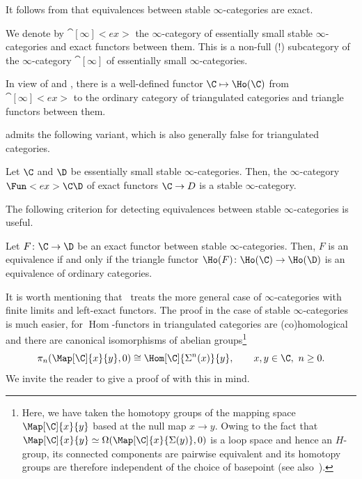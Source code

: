 \documentclass[a4paper]{amsart}
\begin{document}
\begin{remark}
  It follows from  that equivalences between stable
  $\infty$-categories are exact.
\end{remark}

\begin{definition}
  We denote by $\cat[\infty]<ex>$ the $\infty$-category of essentially small
  stable $\infty$-categories and exact functors between them. This is a non-full
  (!) subcategory of the $\infty$-category $\cat[\infty]$ of essentially small
  $\infty$-categories.
\end{definition}

\begin{remark}
  In view of  and
  , there is a well-defined functor
  $\C\mapsto\Ho(\C)$ from $\cat[\infty]<ex>$ to the ordinary category of
  triangulated categories and triangle functors between them.
\end{remark}

 admits the following variant, which is
also generally false for triangulated categories.

\begin{proposition}
  Let $\C$ and $\D$ be essentially small stable $\infty$-categories. Then, the
  $\infty$-category $\Fun<ex>{\C}{\D}$ of exact functors $\C\to D$ is a stable
  $\infty$-category.
\end{proposition}

The following criterion for detecting equivalences between stable
$\infty$-categories is useful.

\begin{proposition}
  \label{prop:equivalences_of_stable_categories}
  Let $F\colon\C\to\D$ be an exact functor between stable $\infty$-categories.
  Then, $F$ is an equivalence if and only if the triangle functor
  $\Ho(F)\colon\Ho(\C)\to\Ho(\D)$ is an equivalence of ordinary categories.
\end{proposition}

\begin{remark}
  It is worth mentioning that~\cite[Theorem~7.6.10]{Cis19} treats the more
  general case of $\infty$-categories with finite limits and left-exact
  functors. The proof in the case of stable $\infty$-categories is much easier, for
  $\operatorname{Hom}$-functors in triangulated categories are (co)homological
  and there are canonical isomorphisms of abelian groups\footnote{Here, we have
    taken the homotopy groups of the mapping space $\Map[\C]{x}{y}$ based at the
  null map $x\to y$. Owing to the fact that
  $\Map[\C]{x}{y}\simeq\Omega(\Map[\C]{x}{\Sigma(y)},0)$ is a loop space and
  hence an $H$-group, its
  connected components are pairwise equivalent and
  its homotopy groups are therefore independent of the choice of basepoint (see also~).}
  \[
    \pi_n(\Map[\C]{x}{y},0)\cong\Hom[\C]{\Sigma^n(x)}{y},\qquad x,y\in\C,\
    n\geq0.
  \]
  We invite the reader to give a proof of
   with this in mind.
\end{remark}
\end{document}
